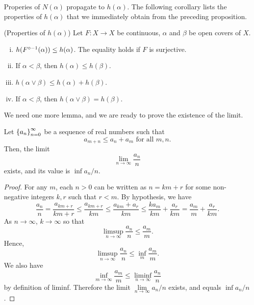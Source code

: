 \documentclass[12pt,twoside,draft]{book}
\begin{document}
Properies of $N(\alpha)$ propagate to $h(\alpha)$.
The following corollary lists the properties of $h(\alpha)$ that we immediately obtain from the preceding proposition.
\begin{corollary}
  (Properties of $h(\alpha)$)
  Let $F: X \to X$ be continuous, $\alpha$ and $\beta$ be open covers of $X$.
  \begin{enumerate}[(i)]
    \item 
      $h(F^{\circ -1}(\alpha)) \leq h(\alpha)$.
      The equality holds if $F$ is surjective.
    \item 
      If $\alpha < \beta$, then $h(\alpha) \leq h(\beta)$.
    \item
      $h(\alpha \vee \beta) \leq h(\alpha) + h(\beta)$.
    \item
      If $\alpha < \beta$, then $h(\alpha \vee \beta) = h(\beta)$.
  \end{enumerate}
  \label{cor:ha-props}
\end{corollary}
We need one more lemma, and we are ready to prove the existence of the limit.
\begin{lemma}
  \citep[Theorem 4.9]{walters}
  Let $\left \{ a_n \right \}^{\infty}_{n = 0}$ be a sequence of real numbers such that 
  \begin{equation*}
    a_{m+n} \leq a_n + a_m \mbox{ for all } m,n.
  \end{equation*}
  Then, the limit
  \begin{equation*}
    \lim\limits_{n \to \infty} \frac{a_n}{n} 
  \end{equation*}
  exists, and its value is $\inf a_n / n$.
  \begin{proof}
    For any $m$, each $n > 0$ can be written as $n = km + r$ for some non-negative integers $k,r$ such that $r < m$.
    By hypothesis, we have 
    \begin{equation*}
      \frac{a_n}{n}
      = \frac{a_{km + r}}{km + r}
      \leq \frac{a_{km + r}}{km}
      \leq \frac{a_{km} + a_r}{km}
      \leq \frac{k a_{m}}{km} + \frac{a_r}{km}
      = \frac{a_{m}}{m} + \frac{a_r}{km}.
    \end{equation*}
    As $n \to \infty$, $k \to \infty$ so that
    \begin{equation*}
      \limsup\limits_{n \to \infty} \frac{a_n}{n} \leq \frac{a_m}{m}.
    \end{equation*}
    Hence,
    \begin{equation*}
      \limsup\limits_{n \to \infty} \frac{a_n}{n} \leq \inf\limits_m \frac{a_m}{m}.
    \end{equation*}
    We also have
    \begin{equation*}
      \inf\limits_{m \to \infty} \frac{a_m}{m} \leq \liminf\limits_{n \to \infty} \frac{a_n}{n}
    \end{equation*}
    by definition of liminf.
    Therefore the limit $\lim\limits_{n \to \infty} a_n/n$ exists, and equals $\inf a_n/n$.
  \end{proof}
\end{lemma}
\end{document}

